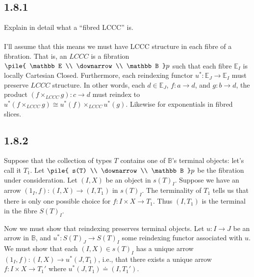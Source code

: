 \documentclass{article}
\newcommand{\vrt}[2]{
\pile{
#1 \\
\downarrow \\
#2
}
}
\begin{document}
\subsection*{1.8.1}

Explain in detail what a ``fibred LCCC'' is.\\~\\

I'll assume that this means we must have LCCC structure in each fibre of a fibration.
That is, an $LCCC$ is a fibration $\vrt{\mathbb E}{\mathbb B}p$ such that each fibre
$\mathbb E_I$ is locally Cartesian Closed. Furthermore, each reindexing functor $u^* : \mathbb E_J \to \mathbb E_I$
must preserve $LCCC$ structure. In other words, each $d \in \mathbb E_J$, $f : a \to d$, and $g : b \to d$,
the product $(f \times_{LCCC} g) : c \to d$ must reindex to $u^*(f \times_{LCCC} g) \cong u^*(f) \times_{LCCC} u^*(g)$. 
Likewise for exponentials in fibred slices. 

\subsection*{1.8.2}

Suppose that the collection of types $T$ contains one of $\mathbb B$'s terminal objects: let's call it $T_1$.
Let $\vrt{s(T)}{\mathbb B}p$ be the fibration under consideration.
Let $(I,X)$ be an object in $s(T)_I$. Suppose we have an arrow $(1_I,f) : (I,X) \to (I, T_1)$ in $s(T)_I$.
The terminality of $T_1$ tells us that there is only one possible choice for $f : I \times X \to T_1$.
Thus $(I, T_1)$ is the terminal in the fibre $S(T)_I$. 

Now we must show that reindexing preserves terminal objects. Let $u : I \to J$ be an arrow in $\mathbb B$,
and $u^* : S(T)_J \to S(T)_I$ some reindexing functor associated with $u$. We must show that each
$(I,X) \in s(T)_I$ has a unique arrow $(1_I,f) : (I,X) \to u^*(J,T_1)$, i.e., that there exists a unique
arrow $f : I \times X \to T_1'$ where $u^*(J,T_1) \doteq (I,T_1')$.
\end{document}
